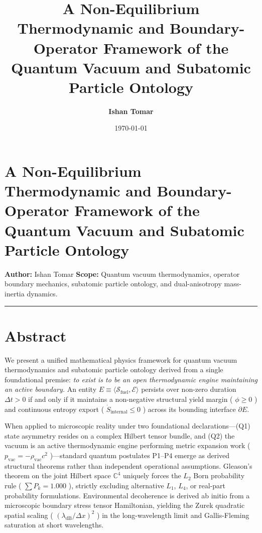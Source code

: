 \documentclass[11pt,a4paper]{article}
\title{\textbf{A Non-Equilibrium Thermodynamic and Boundary-Operator Framework of the Quantum Vacuum and Subatomic Particle Ontology}}\author{\textbf{Ishan Tomar}}\date{\today}
\theoremstyle{definition}\newtheorem{definition}{Definition}
\theoremstyle{remark}\newtheorem{remark}{Remark}
\begin{document}
\maketitle\tableofcontents\newpage


\section*{A Non-Equilibrium Thermodynamic and Boundary-Operator Framework of the Quantum Vacuum and Subatomic Particle Ontology}

\textbf{Author:} Ishan Tomar  
\textbf{Scope:} Quantum vacuum thermodynamics, operator boundary mechanics, subatomic particle ontology, and dual-anisotropy mass-inertia dynamics.

\noindent\rule{\linewidth}{0.4pt}
\section{Abstract}

We present a unified mathematical physics framework for quantum vacuum thermodynamics and subatomic particle ontology derived from a single foundational premise: \textit{to exist is to be an open thermodynamic engine maintaining an active boundary.} An entity $E \equiv \langle \mathcal{S}_{\text{fuel}}, \mathcal{E} \rangle$ persists over non-zero duration $\Delta t > 0$ if and only if it maintains a non-negative structural yield margin ( $\phi \ge 0$ ) and continuous entropy export ( $\dot{S}_{\text{internal}} \le 0$ ) across its bounding interface $\partial E$.

When applied to microscopic reality under two foundational declarations—(Q1) state asymmetry resides on a complex Hilbert tensor bundle, and (Q2) the vacuum is an active thermodynamic engine performing metric expansion work ( $p_{\text{vac}} = -\rho_{\text{vac}} c^2$ )—standard quantum postulates P1–P4 emerge as derived structural theorems rather than independent operational assumptions. Gleason's theorem on the joint Hilbert space $\mathbb{C}^4$ uniquely forces the $L_2$ Born probability rule ( $\sum P_k = 1.000$ ), strictly excluding alternative $L_1$, $L_4$, or real-part probability formulations. Environmental decoherence is derived ab initio from a microscopic boundary stress tensor Hamiltonian, yielding the Zurek quadratic spatial scaling ( $(\lambda_{\text{dB}}/\Delta x)^2$ ) in the long-wavelength limit and Gallis-Fleming saturation at short wavelengths.
\end{document}
